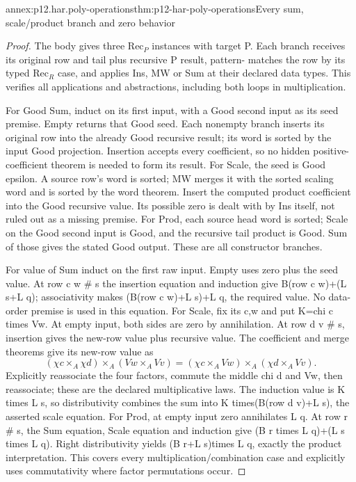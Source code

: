\begin{annexitem}{annex:p12.har.poly-operations}{thm:p12-har-poly-operations}{Every sum, scale/product branch and zero behavior}
\begin{proof}
The body gives three \(\mathrm{Rec}_P\) instances with target P. Each branch
receives its original row and tail plus recursive P result, pattern-
matches the row by its typed \(\mathrm{Rec}_R\) case, and applies Ins, MW or
Sum at their declared data types. This verifies all applications and
abstractions, including both loops in multiplication.

For Good Sum, induct on its first input, with a Good second input
as its seed premise. Empty returns that Good seed. Each nonempty
branch inserts its original row into the already Good recursive result;
its word is sorted by the input Good projection. Insertion accepts
every coefficient, so no hidden positive-coefficient theorem is needed
to form its result. For Scale, the seed is Good epsilon. A source
row's word is sorted; MW merges it with the sorted scaling word and
is sorted by the word theorem. Insert the computed product coefficient
into the Good recursive value. Its possible zero is dealt with by
Ins itself, not ruled out as a missing premise. For Prod, each source
head word is sorted; Scale on the Good second input is Good, and
the recursive tail product is Good. Sum of those gives the stated
Good output. These are all constructor branches.

For value of Sum induct on the first raw input. Empty uses zero plus
the seed value. At row c w \# s the insertion equation and induction
give B(row c w)+(L s+L q); associativity makes (B(row c w)+L s)+L q,
the required value. No data-order premise is used in this equation.
For Scale, fix its c,w and put K=chi c times Vw. At empty input,
both sides are zero by annihilation. At row d v \# s, insertion gives
the new-row value plus recursive value. The coefficient and merge
theorems give its new-row value as
\[
 (\chi c\times_A\chi d)\times_A(Vw\times_A Vv)
       = (\chi c\times_A Vw)\times_A(\chi d\times_A Vv).
\]
Explicitly reassociate the four factors, commute the middle chi d
and Vw, then reassociate; these are the declared multiplicative laws.
The induction value is K times L s, so distributivity combines the
sum into K times(B(row d v)+L s), the asserted scale equation.
For Prod, at empty input zero annihilates L q. At row r \# s, the
Sum equation, Scale equation and induction give
(B r times L q)+(L s times L q). Right distributivity yields
(B r+L s)times L q, exactly the product interpretation. This covers
every multiplication/combination case and explicitly uses commutativity
where factor permutations occur.


\end{proof}
\end{annexitem}

